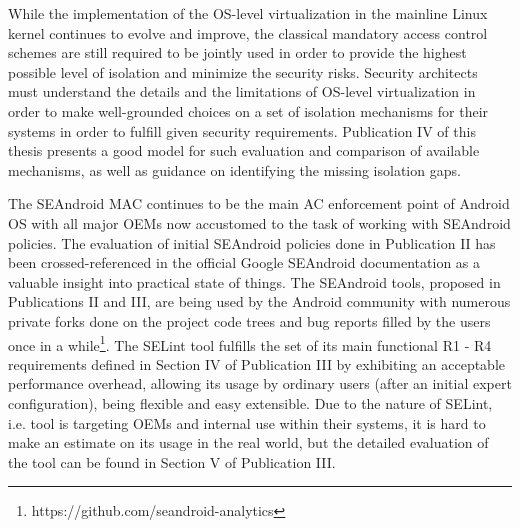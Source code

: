 While the implementation of the OS-level virtualization in the mainline Linux kernel continues to evolve and improve, the classical mandatory access control schemes are still required to be jointly used in order to provide the highest possible level of isolation and minimize the security risks. Security architects must understand the details and the limitations of OS-level virtualization in order to make well-grounded choices on a set of isolation mechanisms for their systems in order to fulfill given security requirements. Publication IV of this thesis presents a good model for such evaluation and comparison of available mechanisms, as well as guidance on identifying the missing isolation gaps. 

The SEAndroid MAC continues to be the main AC enforcement point of Android OS with all major OEMs now accustomed to the task of working with SEAndroid policies. The evaluation of initial SEAndroid policies done in Publication II has been crossed-referenced in the official Google SEAndroid documentation as a valuable insight into practical state of things. The SEAndroid tools, proposed in Publications II and III, are being used by the Android community with numerous private forks done on the project code trees and bug reports filled by the users once in a while\footnote{https://github.com/seandroid-analytics}. The SELint tool fulfills the set of its main functional R1 - R4 requirements defined in Section IV of Publication III by exhibiting an acceptable performance overhead, allowing its usage by ordinary users (after an initial expert configuration), being flexible and easy extensible. Due to the nature of SELint, i.e. tool is targeting OEMs and internal use within their systems, it is hard to make an estimate on its usage in the real world, but the detailed evaluation of the tool can be found in Section V of Publication III. 



